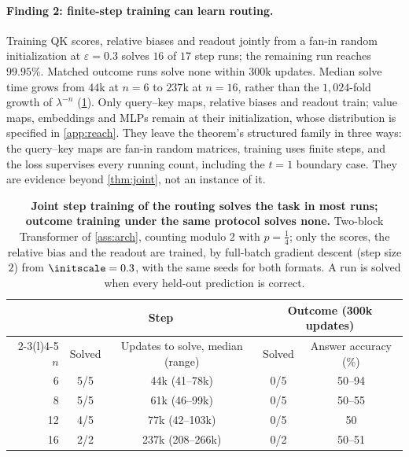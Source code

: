 \paragraph{Finding 2: finite-step training can learn routing.}
Training QK scores, relative biases and readout jointly from a fan-in random initialization
at $\varepsilon=0.3$ solves $16$ of $17$ step runs; the remaining run reaches $99.95\%$.
Matched outcome runs solve none within $300$k updates. Median solve time grows from
$44$k at $n=6$ to $237$k at $n=16$, rather than the $1{,}024$-fold growth of $\lambda^{-n}$
(\cref{tab:reach}). Only query--key maps, relative biases and readout train;
value maps, embeddings and MLPs remain at their initialization, whose distribution is specified
in \cref{app:reach}. They leave the theorem's
structured family in three ways: the query--key maps are fan-in random matrices, training uses finite steps, and the loss
supervises every running count, including the $t=1$ boundary case. They are evidence beyond \cref{thm:joint}, not an instance of it.

\begin{table}[t]
\caption{\textbf{Joint step training of the routing solves the task in most runs; outcome training under the same protocol solves
none.} Two-block Transformer of \cref{ass:arch}, counting modulo $2$ with $p=\tfrac{1}{4}$; only the scores, the relative bias and the
readout are trained, by full-batch gradient descent (step size $2$) from $\initscale=0.3$, with the same seeds for both formats. A run is
solved when every held-out prediction is correct.}
\label{tab:reach}
\centering\small
\begin{tabular}{@{}rcccc@{}}
\toprule
 & \multicolumn{2}{c}{Step} & \multicolumn{2}{c}{Outcome (300k updates)}\\
\cmidrule(lr){2-3}\cmidrule(l){4-5}
$n$ & Solved & Updates to solve, median (range) & Solved & Answer accuracy (\%)\\
\midrule
6  & 5/5 & 44k (41--78k)   & 0/5 & 50--94\\
8  & 5/5 & 61k (46--99k)   & 0/5 & 50--55\\
12 & 4/5 & 77k (42--103k)  & 0/5 & 50\\
16 & 2/2 & 237k (208--266k) & 0/2 & 50--51\\
\bottomrule
\end{tabular}
\end{table}

